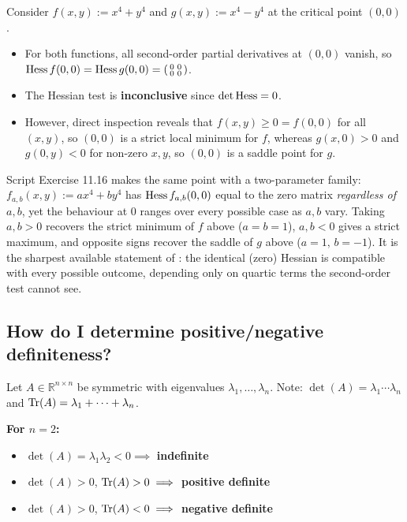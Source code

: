 \begin{aiexample}
Consider $f(x,y) := x^4 + y^4$ and $g(x,y) := x^4 - y^4$ at the critical point $(0,0)$.
\begin{itemize}
  \item For both functions, all second-order partial derivatives at $(0,0)$ vanish, so $\operatorname{Hess} f(0,0) = \operatorname{Hess} g(0,0) = \left(\begin{smallmatrix} 0 & 0 \\ 0 & 0 \end{smallmatrix}\right)$.
  \item The Hessian test is \textbf{inconclusive} since $\det \operatorname{Hess} = 0$.
  \item However, direct inspection reveals that $f(x,y) \geq 0 = f(0,0)$ for all $(x,y)$, so $(0,0)$ is a strict local minimum for $f$, whereas $g(x,0) > 0$ and $g(0,y) < 0$ for non-zero $x,y$, so $(0,0)$ is a saddle point for $g$.
\end{itemize}
\end{aiexample}

\begin{remark}
Script Exercise 11.16 makes the same point with a two-parameter family:
$f_{a,b}(x,y) := ax^4+by^4$ has $\operatorname{Hess} f_{a,b}(0,0)$ equal to the zero matrix \emph{regardless of
$a,b$}, yet the behaviour at $0$ ranges over every possible case as $a,b$ vary. Taking $a,b>0$
recovers the strict minimum of $f$ above ($a=b=1$), $a,b<0$ gives a strict maximum, and opposite
signs recover the saddle of $g$ above ($a=1,\,b=-1$). It is the sharpest available statement of
: the identical (zero) Hessian is compatible with
every possible outcome, depending only on quartic terms the second-order test cannot see.
\end{remark}

\subsection{How do I determine positive/negative definiteness?}

Let $A \in \mathbb{R}^{n\times n}$ be symmetric with eigenvalues $\lambda_1,\dots,\lambda_n$.
Note: $\det(A) = \lambda_1\cdots\lambda_n$ and $\operatorname{Tr}(A) = \lambda_1+\dots+\lambda_n$.

\textbf{For $n = 2$:}
\begin{itemize}
  \item $\det(A) = \lambda_1\lambda_2 < 0 \implies$ \textbf{indefinite}
  \item $\det(A) > 0$, $\operatorname{Tr}(A) > 0 \implies$ \textbf{positive definite}
  \item $\det(A) > 0$, $\operatorname{Tr}(A) < 0 \implies$ \textbf{negative definite}
\end{itemize}

